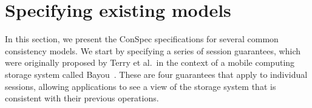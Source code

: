 \documentclass[journal,compsoc]{IEEEtran}
\begin{document}

 \section{Specifying existing models}\label{sec:list}
In this section, we present the ConSpec specifications for several common
consistency models.
We start by specifying a series of session guarantees, which were originally proposed by Terry et al.\ in the context of a mobile computing storage system called Bayou~\cite{Terry:1994:SGW:645792.668302}. These are four guarantees that apply to individual sessions, allowing applications to see a view of the storage system that is consistent with their previous operations.
\end{document}
